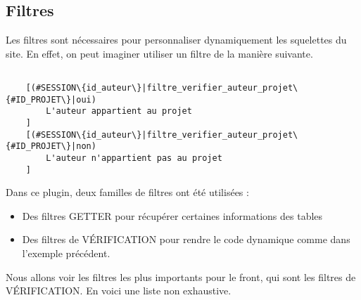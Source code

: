 \newpage

\subsection{Filtres}

Les filtres sont nécessaires pour personnaliser dynamiquement les squelettes du site. En effet, on peut imaginer utiliser un filtre de la manière suivante. 

\vspace{0.2cm}

\begin{lstlisting}

    [(#SESSION\{id_auteur\}|filtre_verifier_auteur_projet\{#ID_PROJET\}|oui)
        L'auteur appartient au projet
    ]
    [(#SESSION\{id_auteur\}|filtre_verifier_auteur_projet\{#ID_PROJET\}|non)
        L'auteur n'appartient pas au projet
    ]

\end{lstlisting}

\vspace{0.4cm}


\vspace{0.5cm}

Dans ce plugin, deux familles de filtres ont été utilisées :
\begin{itemize}
    \item Des filtres GETTER pour récupérer certaines informations des tables
    \item Des filtres de VÉRIFICATION pour rendre le code dynamique comme dans l'exemple précédent.
\end{itemize}
Nous allons voir les filtres les plus importants pour le front, qui sont les filtres de VÉRIFICATION. En voici une liste non exhaustive.

\vspace{0.5cm}

